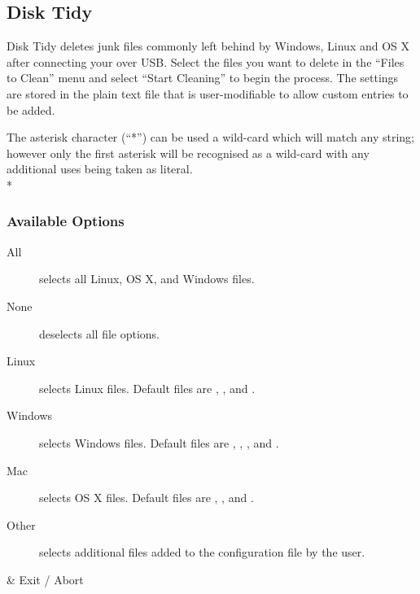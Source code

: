 \subsection{Disk Tidy}
  Disk Tidy deletes junk files commonly left behind by Windows, Linux and
  OS X after connecting your \dap{} over USB. Select the files you want to
  delete in the ``Files to Clean'' menu and select ``Start Cleaning'' to begin
  the process. The settings are stored in the plain text file
   that is user-modifiable to allow
  custom entries to be added.
  
  The asterisk character (``*'') can be used a wild-card which will match any
  string; however only the first asterisk will be recognised as a wild-card 
  with any additional uses being taken as literal.\\*
  

  \subsubsection{Available Options}
  \begin{description}
    \item[All] selects all Linux, OS X, and Windows files.
    \item[None] deselects all file options.
    \item[Linux] selects Linux files. Default files are
      , , and .
    \item[Windows] selects Windows files. Default files are
      , , ,  and
      .
    \item[Mac] selects OS X files. Default files are , ,
       and .
    \item[Other] selects additional files added to the configuration file by the
                 user.
  \end{description}
  
  \begin{btnmap}
      \ActionStdCancel
      & Exit / Abort\\
  \end{btnmap}
